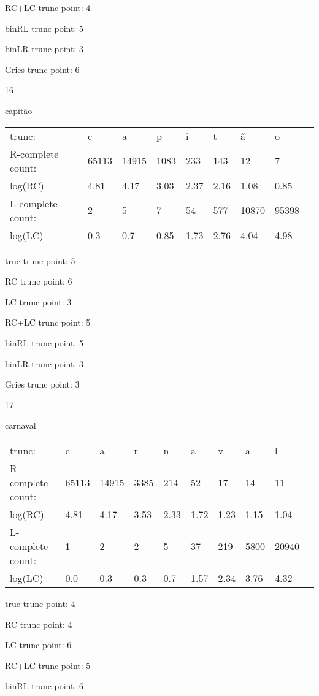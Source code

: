 \documentclass[10pt]{article}
\begin{document}
RC+LC trunc point: 4

binRL trunc point: 5

binLR trunc point: 3

Gries trunc point: 6

\vspace{1em}

16

capitão

\begin{tabular}{l|llllllll}
trunc: & c & a & p & i & t & ã & o & \\ 
R-complete count: & 65113 & 14915 & 1083 & 233 & 143 & 12 & 7 & \\ 
log(RC) & 4.81 & 4.17 & 3.03 & 2.37 & 2.16 & 1.08 & 0.85 & \\ 
L-complete count: & 2 & 5 & 7 & 54 & 577 & 10870 & 95398 & \\ 
log(LC) & 0.3 & 0.7 & 0.85 & 1.73 & 2.76 & 4.04 & 4.98 & \\ 
\end{tabular}

true trunc point: 5

RC trunc point: 6

LC trunc point: 3

RC+LC trunc point: 5

binRL trunc point: 5

binLR trunc point: 3

Gries trunc point: 3

\newpage

17

carnaval

\begin{tabular}{l|lllllllll}
trunc: & c & a & r & n & a & v & a & l & \\ 
R-complete count: & 65113 & 14915 & 3385 & 214 & 52 & 17 & 14 & 11 & \\ 
log(RC) & 4.81 & 4.17 & 3.53 & 2.33 & 1.72 & 1.23 & 1.15 & 1.04 & \\ 
L-complete count: & 1 & 2 & 2 & 5 & 37 & 219 & 5800 & 20940 & \\ 
log(LC) & 0.0 & 0.3 & 0.3 & 0.7 & 1.57 & 2.34 & 3.76 & 4.32 & \\ 
\end{tabular}

true trunc point: 4

RC trunc point: 4

LC trunc point: 6

RC+LC trunc point: 5

binRL trunc point: 6
\end{document}
